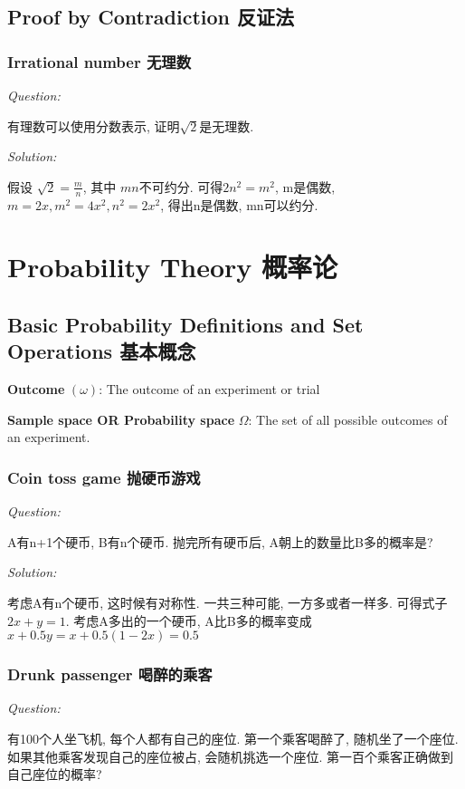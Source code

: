 \documentclass[12pt]{book}
\begin{document}
\section{Proof by Contradiction 反证法}
\subsection{Irrational number 无理数}
\noindent \textit{Question:}

有理数可以使用分数表示, 证明$\sqrt{2}$是无理数.

 \noindent \textit{Solution:} 
 
 假设 $\sqrt{2}=\frac{m}{n}$, 其中 $mn $不可约分. 可得$2n^2=m^2$, m是偶数, $m=2x, m^2=4x^2, n^2=2x^2$, 得出n是偶数, mn可以约分.
 
  
\chapter{Probability Theory 概率论}
\section{Basic Probability Definitions and Set Operations 基本概念}

\textbf{Outcome} $(\omega)$: The outcome of an experiment or trial

\textbf{Sample space OR Probability space} $\Omega$: The set of all possible outcomes of an experiment.

\subsection{Coin toss game 抛硬币游戏}
\noindent \textit{Question:}

A有n+1个硬币, B有n个硬币. 抛完所有硬币后, A朝上的数量比B多的概率是?

 \noindent \textit{Solution:} 
 
 考虑A有n个硬币, 这时候有对称性. 一共三种可能, 一方多或者一样多. 可得式子 $2x+y=1$. 考虑A多出的一个硬币, A比B多的概率变成 $x+0.5y=x+0.5(1-2x)=0.5$

\subsection{Drunk passenger 喝醉的乘客}
\noindent \textit{Question:}

有100个人坐飞机, 每个人都有自己的座位. 第一个乘客喝醉了, 随机坐了一个座位. 如果其他乘客发现自己的座位被占, 会随机挑选一个座位. 第一百个乘客正确做到自己座位的概率?
\end{document}
